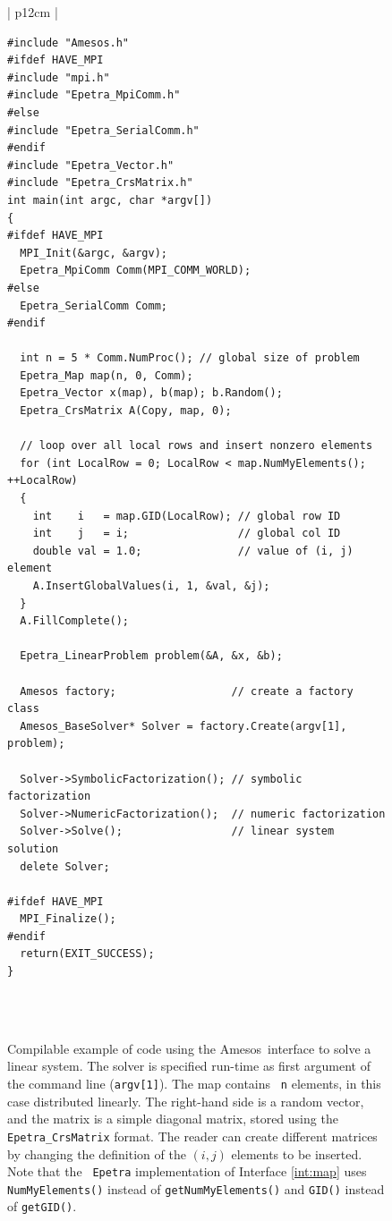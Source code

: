 \documentclass[acmtoms,acmnow]{acmtrans2m}
\newcommand{\amesos}{{\sc Amesos}}
\begin{document}
\begin{figure}
\begin{center}
\begin{tabular}{| p{12cm} | }
\hline
 \\
\begin{minipage}{12cm}
\begin{verbatim}
#include "Amesos.h"
#ifdef HAVE_MPI
#include "mpi.h"
#include "Epetra_MpiComm.h"
#else
#include "Epetra_SerialComm.h"
#endif
#include "Epetra_Vector.h"
#include "Epetra_CrsMatrix.h"
int main(int argc, char *argv[])
{
#ifdef HAVE_MPI
  MPI_Init(&argc, &argv);
  Epetra_MpiComm Comm(MPI_COMM_WORLD);
#else
  Epetra_SerialComm Comm;
#endif

  int n = 5 * Comm.NumProc(); // global size of problem
  Epetra_Map map(n, 0, Comm);
  Epetra_Vector x(map), b(map); b.Random();
  Epetra_CrsMatrix A(Copy, map, 0);

  // loop over all local rows and insert nonzero elements
  for (int LocalRow = 0; LocalRow < map.NumMyElements(); ++LocalRow) 
  {
    int    i   = map.GID(LocalRow); // global row ID
    int    j   = i;                 // global col ID
    double val = 1.0;               // value of (i, j) element
    A.InsertGlobalValues(i, 1, &val, &j);
  }
  A.FillComplete();

  Epetra_LinearProblem problem(&A, &x, &b); 

  Amesos factory;                  // create a factory class
  Amesos_BaseSolver* Solver = factory.Create(argv[1], problem);

  Solver->SymbolicFactorization(); // symbolic factorization
  Solver->NumericFactorization();  // numeric factorization
  Solver->Solve();                 // linear system solution
  delete Solver;

#ifdef HAVE_MPI
  MPI_Finalize();
#endif
  return(EXIT_SUCCESS);
} 
\end{verbatim}
\end{minipage} \\
 \\
 \hline
\end{tabular}
\caption{Compilable example of code using the \amesos\ interface
  to solve a linear system. The solver is specified run-time as first
argument of the command line ({\tt argv[1]}). The map contains {\tt
n} elements, in this case distributed linearly. The
right-hand side is a random vector, and the matrix is a simple
diagonal matrix, stored using the {\tt Epetra\_CrsMatrix} format. 
The reader can create different matrices by changing the definition of the
$(i,j)$ elements to be inserted.
Note that the {\tt
Epetra} implementation of Interface \ref{int:map} uses {\tt NumMyElements()}
instead of {\tt getNumMyElements()} and {\tt GID()} instead of {\tt getGID()}.}
\label{fig:example}
\end{center}
\end{figure}
\end{document}

